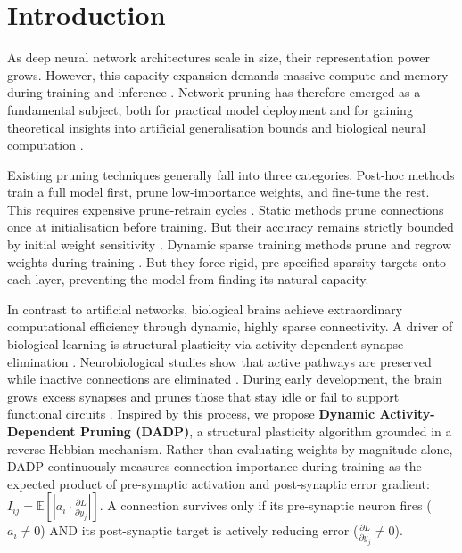 \section{Introduction}

As deep neural network architectures scale in size, their representation power grows. However, this capacity expansion demands massive compute and memory during training and inference \citep{hoffmann2022training}. Network pruning has therefore emerged as a fundamental subject, both for practical model deployment \citep{lecun1989optimal, hassibi1993second, reed1993pruning, han2015learning, sze2017efficient} and for gaining theoretical insights into artificial generalisation bounds \citep{arora2018stronger} and biological neural computation \citep{tanaka2019from}.

Existing pruning techniques generally fall into three categories. Post-hoc methods train a full model first, prune low-importance weights, and fine-tune the rest. This requires expensive prune-retrain cycles \citep{han2016deep}. Static methods prune connections once at initialisation before training. But their accuracy remains strictly bounded by initial weight sensitivity \citep{lee2019snip, tanaka2020pruning}. Dynamic sparse training methods prune and regrow weights during training \citep{evci2020rigging}. But they force rigid, pre-specified sparsity targets onto each layer, preventing the model from finding its natural capacity.

In contrast to artificial networks, biological brains achieve extraordinary computational efficiency through dynamic, highly sparse connectivity. A driver of biological learning is structural plasticity via activity-dependent synapse elimination \citep{hebb1949organization, han2024developmental}. Neurobiological studies show that active pathways are preserved while inactive connections are eliminated \citep{faust2021mechanisms, mikuni2013arc, yasuda2021activity}. During early development, the brain grows excess synapses and prunes those that stay idle or fail to support functional circuits \citep{huttenlocher1979synaptic, huttenlocher2002neural}. Inspired by this process, we propose \textbf{Dynamic Activity-Dependent Pruning (DADP)}, a structural plasticity algorithm grounded in a reverse Hebbian mechanism. Rather than evaluating weights by magnitude alone, DADP continuously measures connection importance during training as the expected product of pre-synaptic activation and post-synaptic error gradient: $I_{ij} = \mathbb{E}\left[ \left| a_i \cdot \frac{\partial L}{\partial y_j} \right| \right]$. A connection survives only if its pre-synaptic neuron fires ($a_i \neq 0$) AND its post-synaptic target is actively reducing error ($\frac{\partial L}{\partial y_j} \neq 0$).


